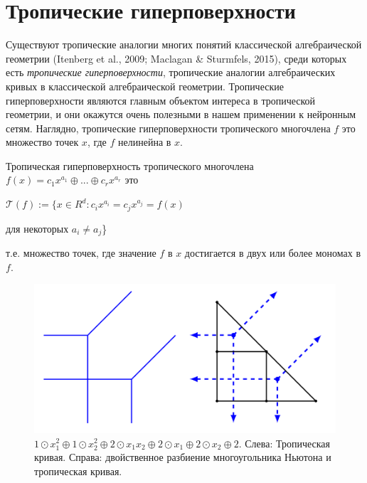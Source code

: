 \documentclass[russian]{lecture-notes}
\begin{document}
	\section{Тропические гиперповерхности}
	Существуют тропические аналогии многих понятий классической алгебраической геометрии (Itenberg et al., 2009; Maclagan \& Sturmfels, 2015), среди которых есть \textit{тропические гиперповерхности}, тропические аналогии алгебраических кривых в классической алгебраической геометрии. Тропические гиперповерхности являются главным объектом интереса в тропической геометрии, и они окажутся очень полезными в нашем применении к нейронным сетям. Наглядно, тропические гиперповерхности тропического многочлена $f$ это множество точек $x$, где $f$ нелинейна в $x$.
	
	\begin{Definition}
		Тропическая гиперповерхность тропического многочлена $f(x) = c_1x^{a_1} \oplus ... \oplus c_rx^{a_r}$ это
		\begin{center}
			$\mathcal{T}(f) := \{x \in R^d : c_ix^{a_i} = c_jx^{a_j} = f(x)$ 
		\end{center}
		\begin{flushright}
			для некоторых $a_i \neq a_j$\}
		\end{flushright}
		т.е. множество точек, где значение $f$ в $x$ достигается в двух или более мономах в $f$.
	\end{Definition}

	\begin{figure}[h]
		\centering
		\includegraphics{tropical_curve}
		\caption{$1 \odot x_1^2 \oplus 1 \odot x_2^2 \oplus 2 \odot x_1x_2 \oplus 2 \odot x_1 \oplus 2 \odot x_2 \oplus 2.$ Слева: Тропическая кривая. Справа: двойственное разбиение многоугольника Ньютона и тропическая кривая.}
	\end{figure}
\end{document}
